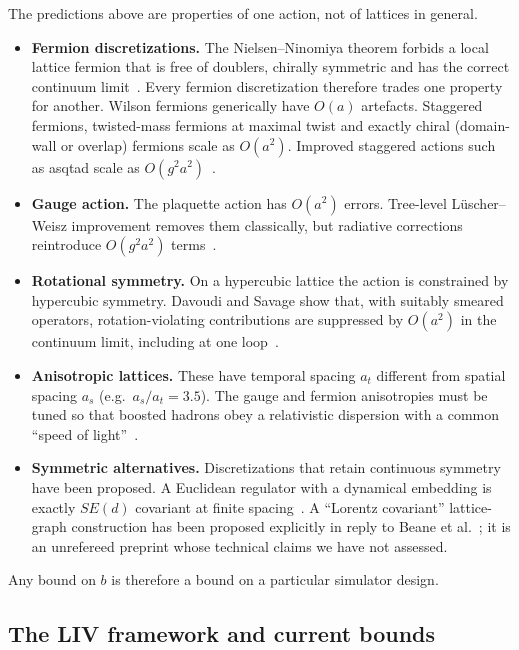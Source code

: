 The predictions above are properties of one action, not of lattices in general.
\begin{itemize}
\item \textbf{Fermion discretizations.} The Nielsen--Ninomiya theorem forbids a local lattice fermion that is free of doublers, chirally symmetric and has the correct continuum limit~\cite{Fodor2012light}. Every fermion discretization therefore trades one property for another. Wilson fermions generically have $O(a)$ artefacts. Staggered fermions, twisted-mass fermions at maximal twist and exactly chiral (domain-wall or overlap) fermions scale as $O(a^2)$. Improved staggered actions such as asqtad scale as $O(g^2a^2)$~\cite{Fodor2012light}.
\item \textbf{Gauge action.} The plaquette action has $O(a^2)$ errors. Tree-level L\"uscher--Weisz improvement removes them classically, but radiative corrections reintroduce $O(g^2a^2)$ terms~\cite{Fodor2012light}.
\item \textbf{Rotational symmetry.} On a hypercubic lattice the action is constrained by hypercubic symmetry. Davoudi and Savage show that, with suitably smeared operators, rotation-violating contributions are suppressed by $O(a^2)$ in the continuum limit, including at one loop~\cite{Davoudi2012restoration}.
\item \textbf{Anisotropic lattices.} These have temporal spacing $a_t$ different from spatial spacing $a_s$ (e.g.\ $a_s/a_t=3.5$). The gauge and fermion anisotropies must be tuned so that boosted hadrons obey a relativistic dispersion with a common ``speed of light''~\cite{Lin2009first}.
\item \textbf{Symmetric alternatives.} Discretizations that retain continuous symmetry have been proposed. A Euclidean regulator with a dynamical embedding is exactly $SE(d)$ covariant at finite spacing~\cite{Gantumur2026rotationally}. A ``Lorentz covariant'' lattice-graph construction has been proposed explicitly in reply to Beane et al.~\cite{Andersen2012lorentz}; it is an unrefereed preprint whose technical claims we have not assessed.
\end{itemize}
Any bound on $b$ is therefore a bound on a particular simulator design.

\subsection{The LIV framework and current bounds}
\label{sec:lattice-liv:liv}

